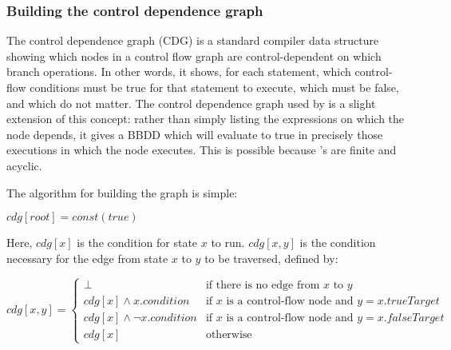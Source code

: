 \subsubsection{Building the control dependence graph}

The control dependence graph (CDG) is a standard compiler data
structure\needCite{} showing which nodes in a control flow graph are
control-dependent on which branch operations.  In other words, it
shows, for each statement, which control-flow conditions must be true
for that statement to execute, which must be false, and which do not
matter.  The control dependence graph used by {\technique} is a slight
extension of this concept: rather than simply listing the expressions
on which the node depends, it gives a BBDD which will evaluate to true
in precisely those executions in which the node executes.  This is
possible because {\technique}'s {\StateMachines} are finite and
acyclic.

The algorithm for building the graph is simple:

\begin{algorithmic}[1]
\State $cdg[root] = const(true)$
\EndWhile
\end{algorithmic}

Here, $cdg[x]$ is the condition for state $x$ to run.  $cdg[x, y]$ is
the condition necessary for the edge from state $x$ to $y$ to be
traversed, defined by:

\begin{displaymath}
cdg[x, y] = \begin{cases}
  \bot                            & \text{if there is no edge from $x$ to $y$} \\
  cdg[x] \wedge x.condition       & \text{if $x$ is a control-flow node and $y = x.trueTarget$} \\
  cdg[x] \wedge {\neg}x.condition & \text{if $x$ is a control-flow node and $y = x.falseTarget$} \\
  cdg[x]                          & \text{otherwise}
\end{cases}
\end{displaymath}

